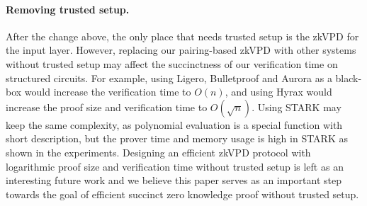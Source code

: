 \paragraph{Removing trusted setup.} After the change above, the only place that needs trusted setup is the zkVPD for the input layer. However, replacing our pairing-based zkVPD with other systems without trusted setup may affect the succinctness of our verification time on structured circuits. For example, using Ligero, Bulletproof and Aurora as a black-box would increase the verification time to $O(n)$, and using Hyrax would increase the proof size and verification time to $O(\sqrt{n})$. Using STARK may keep the same complexity, as polynomial evaluation is a special function with short description, but the prover time and memory usage is high in STARK as shown in the experiments. Designing an efficient zkVPD protocol with logarithmic proof size and verification time without trusted setup is left as an interesting future work and we believe this paper serves as an important step towards the goal of efficient succinct zero knowledge proof without trusted setup. 